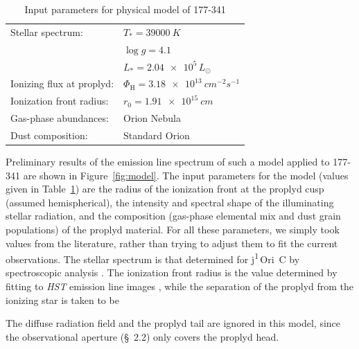 \documentclass[useAMS,usenatbib]{mn2e}
\newcommand{\texttheta}{\greektext j\latintext}
\newcommand\thC{\texttheta\textsuperscript{1}\,Ori~C}
\begin{document}
\begin{table}
  \centering
  \caption{Input parameters for physical model of 177-341} 
  \begin{tabular}{ll}\hline
    Stellar spectrum:& 
    \(T_* = \SI{39000}{K}\)\\
    \citep{2006AandA...448..351S} & \(\log g = 4.1\)\\
    & \(L_* = \num{2.04e5}\,L_\odot\)\\
    Ionizing flux at proplyd:& 
    \(\Phi_{\mathrm{H}} = \SI{3.18e13}{cm^{-2} s^{-1}}\)
    \\
    Ionization front radius:& 
    \(r_0 = \SI{1.91e15}{cm}\)
    \\
    Gas-phase abundances: & Orion Nebula  \citep{2004MNRAS.355..229E}\\
    Dust composition: & Standard Orion \citep{1991ApJ...374..580B}\\
    \hline
  \end{tabular}
  \label{tab:model:pars}
\end{table}

Preliminary results of the emission line spectrum of such a model applied to 177-341 are shown in Figure~\ref{fig:model}.  
The input parameters for the model (values given in Table~\ref{tab:model:pars}) are the radius of the ionization front at the proplyd cusp (assumed hemispherical), the intensity and spectral shape of the illuminating stellar radiation, and the composition (gas-phase elemental mix and dust grain populations) of the proplyd material.  
For all these parameters, we simply took values from the literature, rather than trying to adjust them to fit the current observations.  
The stellar spectrum is that determined for \thC{} by spectroscopic analysis \citep{2006AandA...448..351S}. 
The ionization front radius is the value determined by fitting to \textit{HST} emission line images \citep{1999AJ....118.2350H}, while the separation of the proplyd from the ionizing star is taken to be 

    

The diffuse radiation field and the proplyd tail are ignored in this model, since the observational aperture (\S~2.2) only covers the proplyd head. 



\end{document}
